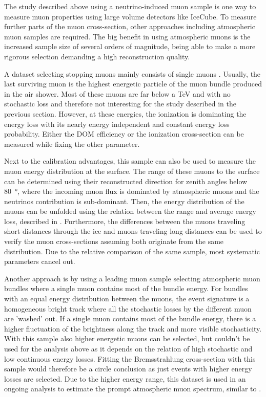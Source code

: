 The study described above using a neutrino-induced muon sample is one way to measure muon properties using large volume detectors like IceCube.
To measure further parts of the muon cross-section, other approaches including atmospheric muon samples are required.
The big benefit in using atmospheric muons is the increased sample size of several orders of magnitude, being able to make a more rigorous selection demanding a high reconstruction quality.

A dataset selecting stopping muons mainly consists of single muons \cite{Hoinka17Master, Ninfa19Master}.
Usually, the last surviving muon is the highest energetic particle of the muon bundle produced in the air shower.
Most of these muons are far below a TeV and with no stochastic loss and therefore not interesting for the study described in the previous section.
However, at these energies, the ionization is dominating the energy loss with its nearly energy independent and constant energy loss probability.
Either the DOM efficiency or the ionization cross-section can be measured while fixing the other parameter.%

Next to the calibration advantages, this sample can also be used to measure the muon energy distribution at the surface.
The range of these muons to the surface can be determined using their reconstructed direction for zenith angles below \SI{80}{\degree}, where the incoming muon flux is dominated by atmospheric muons and the neutrinos contribution is sub-dominant.
Then, the energy distribution of the muons can be unfolded using the relation between the range and average energy loss, described in .
Furthermore, the differences between the muons traveling short distances through the ice and muons traveling long distances can be used to verify the muon cross-sections assuming both originate from the same distribution.
Due to the relative comparison of the same sample, most systematic parameters cancel out.

Another approach is by using a leading muon sample selecting atmospheric muon bundles where a single muon contains most of the bundle energy.
For bundles with an equal energy distribution between the muons, the event signature is a homogeneous bright track where all the stochastic losses by the different muon are 'washed' out.
If a single muon contains most of the bundle energy, there is a higher fluctuation of the brightness along the track and more visible stochasticity.
With this sample also higher energetic muons can be selected, but couldn't be used for the analysis above as it depends on the relation of high stochastic and low continuous energy losses.
Fitting the Bremsstrahlung cross-section with this sample would therefore be a circle conclusion as just events with higher energy losses are selected.
Due to the higher energy range, this dataset is used in an ongoing analysis to estimate the prompt atmospheric muon spectrum, similar to \cite{Fuchs16PhD, Fuchs16ECRS}.

